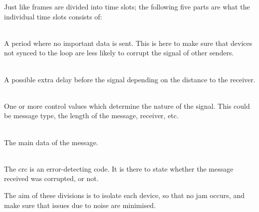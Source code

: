 \noindent
Just like frames are divided into time slots; the following five parts are what the individual time slots consists of:

\begin{description}[labelindent=\parindent]
	\item[Guard time]\hfill\\ 
	A period where no important data is sent.
	This is here to make sure that devices not synced to the loop are less likely to corrupt the signal of other senders.

	\item[Sync]\hfill\\ 
	A possible extra delay before the signal depending on the distance to the receiver.

	\item[Control]\hfill\\
	One or more control values which determine the nature of the signal. 
	This could be message type, the length of the message, receiver, etc.

	\item[Data]\hfill\\
	The main data of the message.

	\item[\acrshort{crc} check]\hfill\\
	The \gls{crc} is an error-detecting code. 
	It is there to state whether the message received was corrupted, or not. 
\end{description}

\bigskip
\noindent
The aim of these divisions is to isolate each device, so that no jam occurs, and make sure that issues due to noise are minimised. 